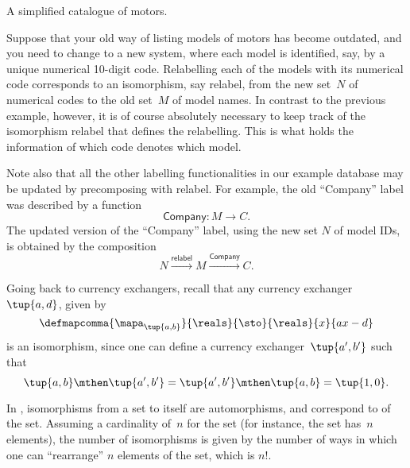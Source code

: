 \begin{example}[Relabelling]
\begin{table*}[h]
        \caption{
            A simplified catalogue of motors.
        }
        \label{tab:electric_motors}
    \end{table*}
    Suppose that your old way of listing models of motors has become outdated, and you need to change to a new system, where each model is identified, say, by a unique numerical 10-digit code.
    Relabelling each of the models with its numerical code corresponds to an isomorphism, say \textsf{relabel}, from the new set~$N$ of numerical codes to the old set~$M$ of model names.
    In contrast to the previous example, however, it is of course absolutely necessary to keep track of the isomorphism \textsf{relabel} that defines the relabelling.
    This is what holds the information of which code denotes which model.

    Note also that all the other labelling functionalities in our example database may be updated by precomposing with \textsf{relabel}.
    For example, the old ``Company'' label was described by a function
    \begin{equation*}
        \textsf{Company}\colon M \to C.
    \end{equation*}
    The updated version of the ``Company'' label, using the new set $N$ of model IDs, is obtained by the composition
    \begin{equation*}
        N \overset{\textsf{relabel}}{\longrightarrow} M \overset{\textsf{Company}}{\longrightarrow} C.
    \end{equation*}
\end{example}

\begin{example}
    Going back to currency exchangers, recall that any currency exchanger~$\tup{a,d}$, given by
    \begin{equation*}
        \defmapcomma{\mapa_{\tup{a,b}}}{\reals}{\sto}{\reals}{x}{ax-d}
    \end{equation*}
    is an isomorphism, since one can define a currency exchanger~$\tup{a',b'}$ such that
    \begin{equation*}
        \tup{a,b}\mthen \tup{a',b'}=\tup{a',b'}\mthen \tup{a,b}=\tup{1,0}.
    \end{equation*}
\end{example}

\begin{example}
    In \FinSet, isomorphisms from a set to itself are automorphisms, and correspond to \emph{} of the set.
    Assuming a cardinality of~$n$ for the set (for instance, the set has~$n$ elements), the number of isomorphisms is given by the number of ways in which one can ``rearrange'' $n$ elements of the set, which is $n!
    $.
\end{example}

